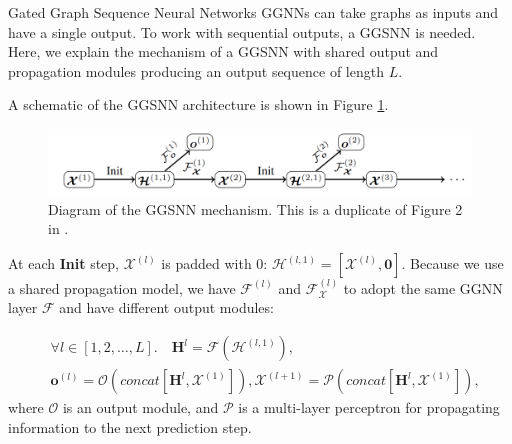 \documentclass[final,hyperref={pdfpagelabels=false}]{beamer}
\begin{document}
\begin{frame}[t]
\begin{columns}[t]
\begin{column}{.3\textwidth}
    \color{oxfordblue}
    
    
    
    \begin{block}{Gated Graph Sequence Neural Networks}
    GGNNs can take graphs as inputs and have a single output. To work with sequential outputs, a GGSNN is needed. Here, we explain the mechanism of a GGSNN with shared output and propagation modules producing an output sequence of length $L$.\vspace{0.2in}
    
    A schematic of the GGSNN architecture is shown in Figure \ref{fig:GGSNN}.
    \begin{figure}
        \centering
        \includegraphics[width=\textwidth]{imgs/ggsnn.png}
        \caption{Diagram of the GGSNN mechanism. This is a duplicate of Figure 2 in \cite{DBLP:journals/corr/LiTBZ15}.}
        \label{fig:GGSNN}
    \end{figure}
    At each \textbf{Init} step, $\boldsymbol{\mathcal{X}}^{(l)}$ is padded with 0: $\boldsymbol{\mathcal{H}}^{(l, 1)} = [\boldsymbol{\mathcal{X}}^{(l)}, \boldsymbol{0}]$.
    Because we use a shared propagation model, we have $\mathcal{F}_{}^{(l)}$ and $\mathcal{F}_{\boldsymbol{\mathcal{X}}}^{(l)}$ to adopt the same GGNN layer $\mathcal{F}$ and have different output modules:
    
    \begin{equation}
    \begin{aligned}
        & \forall l \in [1, 2, \ldots, L].\quad \boldsymbol{H}^l = \boldsymbol{\mathcal{F}}\left(\boldsymbol{\mathcal{H}}^{(l, 1)}\right),\\
        & \boldsymbol{o}^{(l)} = 
        \boldsymbol{\mathcal{O}} \left(concat[\boldsymbol{H}^l, \boldsymbol{\mathcal{X}}^{(1)}]\right),
        \boldsymbol{\mathcal{X}}^{(l+1)} = \boldsymbol{\mathcal{P}}\left(concat[\boldsymbol{H}^l, \boldsymbol{\mathcal{X}}^{(1)}]\right),
    \end{aligned}
    \end{equation}
    where $\boldsymbol{\mathcal{O}}$ is an output module, and $\boldsymbol{\mathcal{P}}$ is a multi-layer perceptron for propagating information to the next prediction step.
    \vspace{0.2in}
    

\end{block}
\end{column}
\end{columns}
\end{frame}
\end{document}
